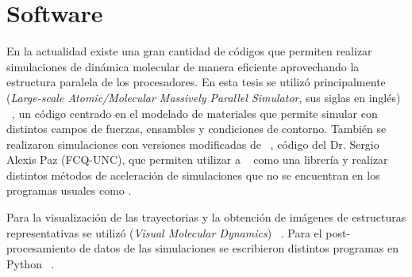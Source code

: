 \section{Software}

En la actualidad existe una gran cantidad de códigos que permiten realizar 
simulaciones de dinámica molecular de manera eficiente aprovechando la estructura
paralela de los procesadores. En esta tesis se utilizó principalmente  
(\textit{Large-scale Atomic/Molecular Massively Parallel Simulator}, sus siglas
en inglés) ~\cite{lammps1, lammps2}, un código centrado en el modelado de 
materiales que permite simular con distintos campos de fuerzas, ensambles y 
condiciones de contorno. También se realizaron simulaciones con versiones 
modificadas de  ~\cite{gems}, código del Dr. Sergio Alexis Paz 
(FCQ-UNC), que permiten utilizar a  ~\cite{dftb+} como una librería
y realizar distintos métodos de aceleración de simulaciones que no se encuentran
en los programas usuales como .

Para la visualización de las trayectorias y la obtención de imágenes de 
estructuras representativas se utilizó  (\textit{Visual Molecular 
Dynamics}) ~\cite{vmd}. Para el post-procesamiento de datos de las simulaciones
se escribieron distintos programas en Python ~\cite{exma, sierras}.
